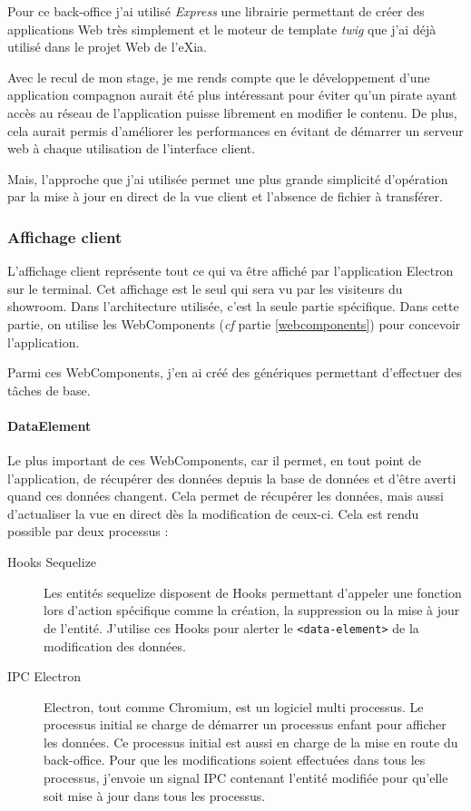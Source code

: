 Pour ce back-office j'ai utilisé \emph{Express} une librairie permettant de créer des applications Web très simplement et le moteur de template \emph{twig} que j'ai déjà utilisé dans le projet Web de l'eXia.

\bigskip

Avec le recul de mon stage, je me rends compte que le développement d'une application compagnon aurait été plus intéressant pour éviter qu'un pirate ayant accès au réseau de l'application puisse librement en modifier le contenu.
De plus, cela aurait permis d'améliorer les performances en évitant de démarrer un serveur web à chaque utilisation de l'interface client.

Mais, l'approche que j'ai utilisée permet une plus grande simplicité d'opération par la mise à jour en direct de la vue client et l'absence de fichier à transférer.

\subsubsection{Affichage client}

 L'affichage client représente tout ce qui va être affiché par l'application Electron sur le terminal.
Cet affichage est le seul qui sera vu par les visiteurs du showroom.
Dans l'architecture utilisée, c'est la seule partie spécifique.
Dans cette partie, on utilise les WebComponents (\emph{cf} partie \ref{webcomponents}) pour concevoir l'application.

Parmi ces WebComponents, j'en ai créé des génériques permettant d'effectuer des tâches de base.


\paragraph{DataElement} Le plus important de ces WebComponents, car il permet, en tout point de l'application, de récupérer des données depuis la base de données et d'être averti quand ces données changent.
Cela permet de récupérer les données, mais aussi d'actualiser la vue en direct dès la modification de ceux-ci.
Cela est rendu possible par deux processus :
\begin{description}
    \item[Hooks Sequelize] Les entités sequelize disposent de Hooks permettant d'appeler une fonction lors d'action spécifique comme la création, la suppression ou la mise à jour de l'entité. J'utilise ces Hooks pour alerter le \texttt{<data-element>} de la modification des données.
    \item[IPC Electron] Electron, tout comme Chromium, est un logiciel multi processus. Le processus initial se charge de démarrer un processus enfant pour afficher les données. Ce processus initial est aussi en charge de la mise en route du back-office. Pour que les modifications soient effectuées dans tous les processus, j'envoie un signal IPC contenant l'entité modifiée pour qu'elle soit mise à jour dans tous les processus.
\end{description}

